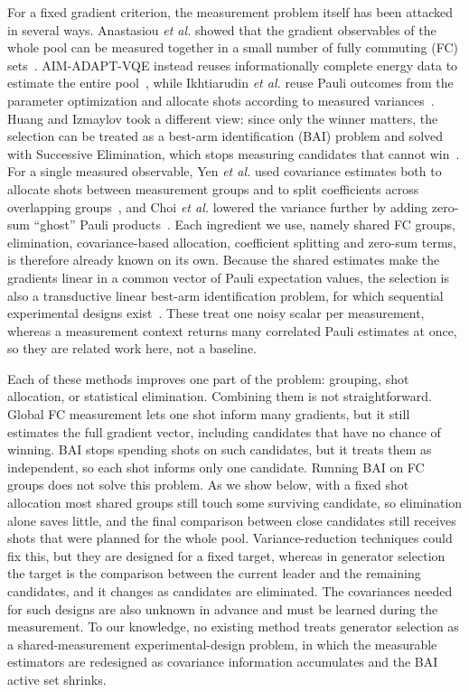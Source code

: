 \documentclass[aps,pra,reprint,superscriptaddress,nofootinbib]{revtex4-2}
\begin{document}
For a fixed gradient criterion, the measurement problem itself has been attacked in several ways. Anastasiou \textit{et al.} showed that the gradient observables of the whole pool can be measured together in a small number of fully commuting (FC) sets~\cite{anastasiou2023}. AIM-ADAPT-VQE instead reuses informationally complete energy data to estimate the entire pool~\cite{nykanen2025}, while Ikhtiarudin \textit{et al.} reuse Pauli outcomes from the parameter optimization and allocate shots according to measured variances~\cite{ikhtiarudin2025}. Huang and Izmaylov took a different view: since only the winner matters, the selection can be treated as a best-arm identification (BAI) problem and solved with Successive Elimination, which stops measuring candidates that cannot win~\cite{huang2026}. For a single measured observable, Yen \textit{et al.} used covariance estimates both to allocate shots between measurement groups and to split coefficients across overlapping groups~\cite{yen2023}, and Choi \textit{et al.} lowered the variance further by adding zero-sum ``ghost'' Pauli products~\cite{choi2022}. Each ingredient we use, namely shared FC groups, elimination, covariance-based allocation, coefficient splitting and zero-sum terms, is therefore already known on its own. Because the shared estimates make the gradients linear in a common vector of Pauli expectation values, the selection is also a transductive linear best-arm identification problem, for which sequential experimental designs exist~\cite{soare2014,fiez2019}. These treat one noisy scalar per measurement, whereas a measurement context returns many correlated Pauli estimates at once, so they are related work here, not a baseline.

Each of these methods improves one part of the problem: grouping, shot allocation, or statistical elimination. Combining them is not straightforward. Global FC measurement lets one shot inform many gradients, but it still estimates the full gradient vector, including candidates that have no chance of winning. BAI stops spending shots on such candidates, but it treats them as independent, so each shot informs only one candidate. Running BAI on FC groups does not solve this problem. As we show below, with a fixed shot allocation most shared groups still touch some surviving candidate, so elimination alone saves little, and the final comparison between close candidates still receives shots that were planned for the whole pool. Variance-reduction techniques could fix this, but they are designed for a fixed target, whereas in generator selection the target is the comparison between the current leader and the remaining candidates, and it changes as candidates are eliminated. The covariances needed for such designs are also unknown in advance and must be learned during the measurement. To our knowledge, no existing method treats generator selection as a shared-measurement experimental-design problem, in which the measurable estimators are redesigned as covariance information accumulates and the BAI active set shrinks.
\end{document}
